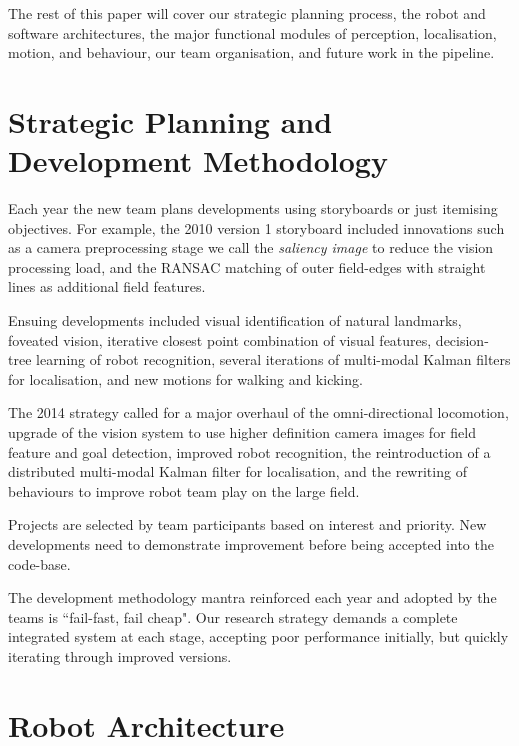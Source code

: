 \documentclass[runningheads,a4paper]{llncs}
\begin{document}
The rest of this paper will cover our strategic planning process, the robot and software architectures, the major functional modules of perception, localisation, motion, and behaviour, our team organisation, and future work in the pipeline. 







\section{Strategic Planning and Development Methodology}

Each year the new team plans developments using storyboards or just itemising objectives. For example, the 2010 version 1 storyboard \cite{hengst2010robocupstoryboard} included innovations such as a camera preprocessing stage we call the \emph{saliency image} to reduce the vision processing load, and the RANSAC matching of outer field-edges with straight lines as additional field features. 

Ensuing developments included visual identification of natural landmarks, foveated vision, iterative closest point combination of visual features, decision-tree learning of robot recognition, several iterations of multi-modal Kalman filters for localisation, and new motions for walking and kicking. 

The 2014 strategy called for a major overhaul of the omni-directional locomotion, upgrade of the vision system to use higher definition  camera images for field feature and goal detection, improved robot recognition, the reintroduction of a distributed multi-modal Kalman filter for localisation, and the rewriting of behaviours to improve robot team play on the large field. 

Projects are selected by team participants based on interest and priority. New developments need to demonstrate improvement before being accepted into the code-base. 

The development methodology mantra reinforced each year and adopted by the teams is ``fail-fast, fail cheap".  Our research strategy demands a complete integrated system at each stage, accepting poor performance initially, but quickly iterating through improved versions. 







\section{Robot Architecture}
\end{document}
